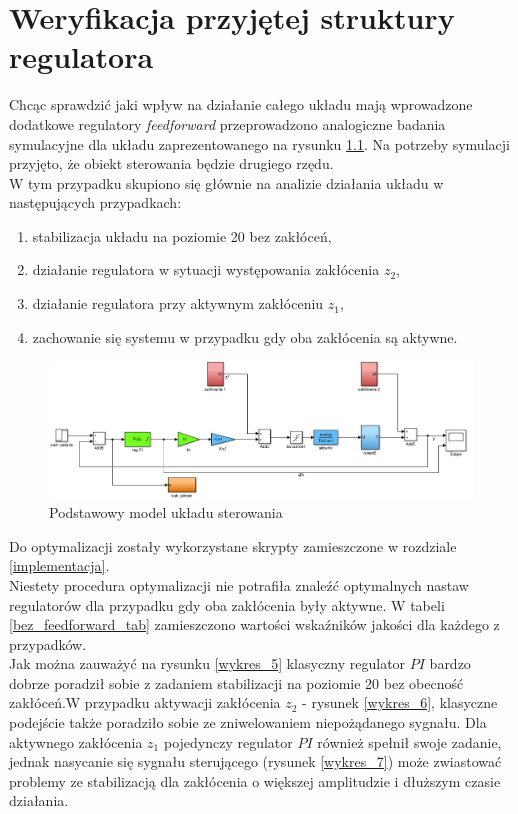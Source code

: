 \chapter{Weryfikacja przyjętej struktury regulatora}
\label{porownanie}
Chcąc sprawdzić jaki wpływ na działanie całego układu mają wprowadzone dodatkowe regulatory \textit{feedforward} przeprowadzono analogiczne badania symulacyjne dla układu zaprezentowanego na rysunku \ref{new_schemat}. Na potrzeby symulacji przyjęto, że obiekt sterowania będzie drugiego rzędu.\\
 W tym przypadku skupiono się głównie na analizie działania układu w następujących przypadkach:
\begin{enumerate}
	\item stabilizacja układu na poziomie 20 bez zakłóceń,
	\item działanie regulatora w sytuacji występowania zakłócenia $z_2$,
	\item działanie regulatora przy aktywnym zakłóceniu $z_1$,
	\item zachowanie się systemu w przypadku gdy oba zakłócenia są aktywne. 
\end{enumerate}
%
\begin{figure}[h!]
	\centering
	\includegraphics[scale = 0.7]{fig/model_podst.jpg}
	\caption		
	{Podstawowy model układu sterowania}
	\label{new_schemat}
\end{figure} 
%
Do optymalizacji zostały wykorzystane skrypty zamieszczone w rozdziale \ref{implementacja}. \\
Niestety procedura optymalizacji nie potrafiła znale\'zć optymalnych nastaw regulatorów dla przypadku gdy oba zakłócenia były aktywne.
W tabeli \ref{bez_feedforward_tab} zamieszczono wartości wska\'zników jakości dla każdego z przypadków.\\
\newpage
Jak można zauważyć na rysunku \ref{wykres_5} klasyczny regulator $PI$ bardzo dobrze poradził sobie z zadaniem stabilizacji na poziomie 20 bez obecność zakłóceń.W przypadku aktywacji zakłócenia $z_2$ - rysunek \ref{wykres_6}, klasyczne podejście także poradziło sobie ze zniwelowaniem niepożądanego sygnału. Dla aktywnego zakłócenia $z_1$ pojedynczy regulator $PI$ również spełnił swoje zadanie, jednak nasycanie się sygnału sterującego (rysunek \ref{wykres_7}) może zwiastować problemy ze stabilizacją dla zakłócenia o większej amplitudzie i dłuższym czasie działania.
